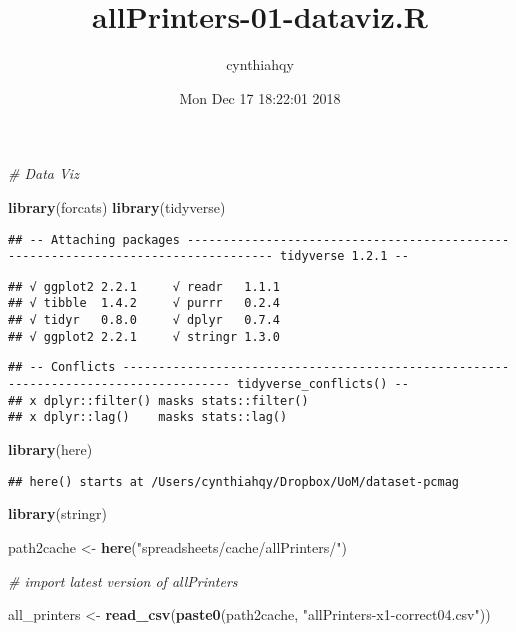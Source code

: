 \documentclass[]{article}
\title{allPrinters-01-dataviz.R}
\author{cynthiahqy}
\date{Mon Dec 17 18:22:01 2018}
\newenvironment{Shaded}{\begin{snugshade}}{\end{snugshade}}
\newcommand{\CommentTok}[1]{\textcolor[rgb]{0.56,0.35,0.01}{\textit{#1}}}
\newcommand{\KeywordTok}[1]{\textcolor[rgb]{0.13,0.29,0.53}{\textbf{#1}}}
\newcommand{\NormalTok}[1]{#1}
\newcommand{\StringTok}[1]{\textcolor[rgb]{0.31,0.60,0.02}{#1}}
\begin{document}
\maketitle

\begin{Shaded}
\begin{Highlighting}[]
\CommentTok{# Data Viz}

\KeywordTok{library}\NormalTok{(forcats)}
\KeywordTok{library}\NormalTok{(tidyverse)}
\end{Highlighting}
\end{Shaded}

\begin{verbatim}
## -- Attaching packages ---------------------------------------------------------------------------------- tidyverse 1.2.1 --
\end{verbatim}

\begin{verbatim}
## √ ggplot2 2.2.1     √ readr   1.1.1
## √ tibble  1.4.2     √ purrr   0.2.4
## √ tidyr   0.8.0     √ dplyr   0.7.4
## √ ggplot2 2.2.1     √ stringr 1.3.0
\end{verbatim}

\begin{verbatim}
## -- Conflicts ------------------------------------------------------------------------------------- tidyverse_conflicts() --
## x dplyr::filter() masks stats::filter()
## x dplyr::lag()    masks stats::lag()
\end{verbatim}

\begin{Shaded}
\begin{Highlighting}[]
\KeywordTok{library}\NormalTok{(here)}
\end{Highlighting}
\end{Shaded}

\begin{verbatim}
## here() starts at /Users/cynthiahqy/Dropbox/UoM/dataset-pcmag
\end{verbatim}

\begin{Shaded}
\begin{Highlighting}[]
\KeywordTok{library}\NormalTok{(stringr)}

\NormalTok{path2cache <-}\StringTok{ }\KeywordTok{here}\NormalTok{(}\StringTok{"spreadsheets/cache/allPrinters/"}\NormalTok{)}

\CommentTok{# import latest version of allPrinters}

\NormalTok{all_printers <-}\StringTok{ }\KeywordTok{read_csv}\NormalTok{(}\KeywordTok{paste0}\NormalTok{(path2cache, }\StringTok{"allPrinters-x1-correct04.csv"}\NormalTok{))}
\end{Highlighting}
\end{Shaded}
\end{document}
